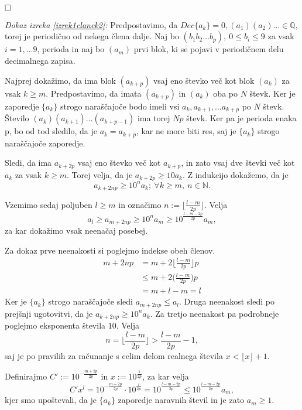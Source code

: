 \documentclass[a4paper,12pt]{article}
\def\N{\mathbb{N}} %
\def\Q{\mathbb{Q}} %
\def\qed{$\hfill\Box$}   %
\begin{document}
\qed

\noindent
{\em Dokaz izreka \ref{izrek1clanek2}:\/} Predpostavimo, da $Dec\{a_k\} = 0,(a_1)(a_2)\dots \in \Q$,
 torej je periodično od nekega člena dalje. Naj bo
$(b_1b_2 \dots b_p), \ 0 \leq b_i \leq 9$ za vsak $i = 1, \dots 9$, perioda in naj bo
$(a_m)$ prvi blok, ki se pojavi v periodičnem delu decimalnega zapisa.

Najprej dokažimo, da ima blok $(a_{k+p})$ vsaj eno števko več kot blok $(a_k)$ za vsak $k \geq m$.
Predpostavimo, da imata $(a_{k+p})$ in $(a_k)$ oba po $N$ števk. 
Ker je zaporedje $\{a_k\}$ strogo naraščajoče bodo imeli vsi $a_k, a_{k+1}, \dots a_{k+p}$ po $N$ števk.
Število $(a_k)(a_{k+1})\dots (a_{k+p-1})$ ima torej $Np$ števk. Ker pa je perioda enaka p,
bo od tod sledilo, da je $a_k = a_{k+p}$, kar ne more biti res, saj je $\{a_k\}$ strogo naraščajoče zaporedje.

Sledi, da ima $a_{k+ 2p}$ vsaj eno števko več kot $a_{k+p}$, in zato vsaj dve števki več kot $a_k$
za vsak $k \geq m$.
Torej velja, da je $a_{k+2p} \geq 10 a_k$. Z indukcijo dokažemo, da je 
\[ a_{k+2np} \geq 10^n a_k; \ \forall k \geq m, \ n \in \N.\]

Vzemimo sedaj poljuben $l \geq m$ in označimo $n := \lfloor \frac{l-m}{2p} \rfloor$.
Velja 
\begin{equation}\label{enacba1}
    a_l \geq a_{m+2np} \geq 10^n a_m \geq 10 ^{\frac{l-m-2p}{2p}}a_m,
\end{equation}
za kar dokažimo vsak neenačaj posebej.

Za dokaz prve neenakosti si poglejmo indekse obeh členov. 
\[
    \begin{split}
    m + 2np &= m + 2 \bigg\lfloor \frac{l-m}{2p}\bigg\rfloor p \\
    &\leq m + 2\bigg(\frac{l-m}{2p}\bigg)p \\
    &= m + l - m = l
    \end{split}
    \] 
Ker je $\{a_k\}$ strogo naraščajoče sledi $a_{m+2np} \leq a_l$.
Druga neenakost sledi po prejšnji ugotovitvi, da je $a_{k+2np} \geq 10^n a_k$.
Za tretjo neenakost pa podrobneje poglejmo eksponenta števila $10$. Velja
\[
    n = \bigg\lfloor \frac{l-m}{2p}\bigg\rfloor > \frac{l-m}{2p} - 1,
     \]
saj je po pravilih za računanje s celim delom realnega števila $x < \lfloor x\rfloor + 1$.

Definirajmo $C' := 10^{-\frac{m + 2p}{2p}}$ in $x := 10^{\frac{1}{2p}}$, za kar velja
\begin{equation}\label{enacba2}
     C'x^l = 10^{-\frac{m + 2p}{2p}} \cdot 10^{\frac{l}{2p}} = 10 ^{\frac{l-m-2p}{2p}}
     \leq 10 ^{\frac{l-m-2p}{2p}} a_m,
\end{equation}
kjer smo upoštevali, da je $\{a_k\}$ zaporedje naravnih števil in je zato $a_m \geq 1$.
\end{document}
